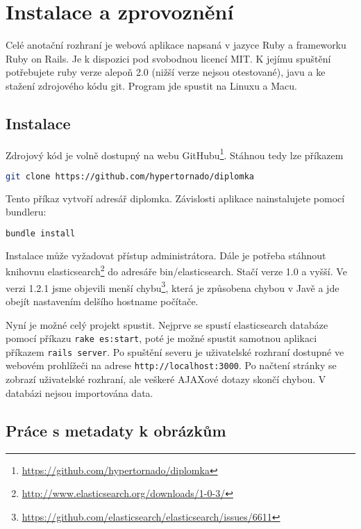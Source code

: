 \chapter{Instalace a zprovoznění}

Celé anotační rozhraní je webová aplikace napsaná v jazyce Ruby a frameworku Ruby on Rails. Je k dispozici pod svobodnou licencí MIT. K jejímu spuštění potřebujete ruby verze alepoň 2.0 (nižší verze nejsou otestované), javu a ke stažení zdrojového kódu git. Program jde spustit na Linuxu a Macu.

\section{Instalace}

Zdrojový kód je volně dostupný na webu GitHubu\footnote{\url{https://github.com/hypertornado/diplomka}}. Stáhnou tedy lze příkazem

\begin{lstlisting}[language=bash]
git clone https://github.com/hypertornado/diplomka
\end{lstlisting}

Tento příkaz vytvoří adresář diplomka. Závislosti aplikace nainstalujete pomocí bundleru:

\begin{lstlisting}[language=bash]
bundle install
\end{lstlisting}

Instalace může vyžadovat přístup administrátora. Dále je potřeba stáhnout knihovnu elasticsearch\footnote{\url{http://www.elasticsearch.org/downloads/1-0-3/}} do adresáře bin/elasticsearch. Stačí verze 1.0 a vyšší. Ve verzi 1.2.1 jsme objevili menší chybu\footnote{\url{https://github.com/elasticsearch/elasticsearch/issues/6611}}, která je způsobena chybou v Javě a jde obejít nastavením delšího hostname počítače.

Nyní je možné celý projekt spustit. Nejprve se spustí elasticsearch databáze pomocí příkazu \lstinline{rake es:start}, poté je možné spustit samotnou aplikaci příkazem \lstinline{rails server}. Po spuštění severu je uživatelské rozhraní dostupné ve webovém prohlížeči na adrese \lstinline{http://localhost:3000}. Po načtení stránky se zobrazí uživatelské rozhraní, ale veškeré AJAXové dotazy skončí chybou. V databázi nejsou importována data.

\section{Práce s metadaty k obrázkům}

